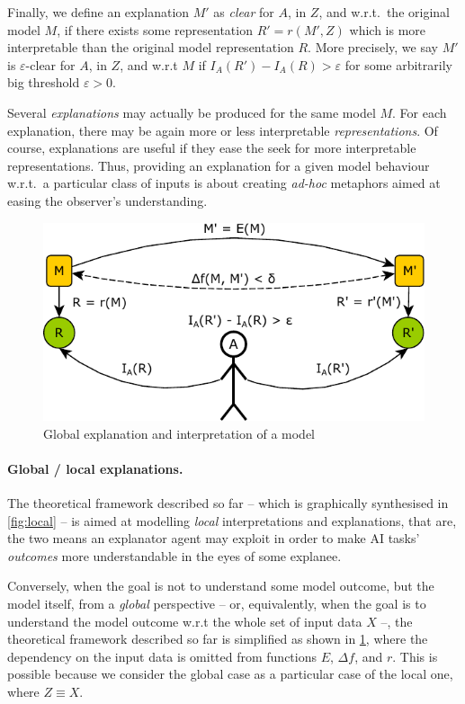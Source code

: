 \documentclass[12pt,a4paper,openright,twoside]{book}
\begin{document}
Finally, we define an explanation $M'$ as \emph{clear} for $A$, in $Z$, and w.r.t.\ the original model $M$, if there exists some representation $R' = r(M', Z)$ which is more interpretable than the original model representation $R$.
%
More precisely, we say $M'$ is $\varepsilon$-clear for $A$, in $Z$, and w.r.t $M$ if $I_A(R') - I_A(R) > \varepsilon$ for some arbitrarily big threshold $\varepsilon > 0$.

Several \emph{explanations} may actually be produced for the same model $M$.
%
For each explanation, there may be again more or less interpretable \emph{representations}.
%
Of course, explanations are useful if they ease the seek for more interpretable representations.
%
Thus, providing an explanation for a given model behaviour w.r.t.\ a particular class of inputs is about creating \emph{ad-hoc} metaphors aimed at easing the observer's understanding.

\begin{figure}
    \centering
    \includegraphics[width=.5\linewidth]{figures/global.pdf}
    \caption{Global explanation and interpretation of a model}
    \label{fig:global}
\end{figure}

\paragraph{Global / local explanations.}

The theoretical framework described so far -- which is graphically synthesised in \cref{fig:local} -- is aimed at modelling \emph{local} interpretations and explanations, that are, the two means an explanator agent may exploit in order to make AI tasks' \emph{outcomes} more understandable in the eyes of some explanee. 

Conversely, when the goal is not to understand some model outcome, but the model itself, from a \emph{global} perspective -- or, equivalently, when the goal is to understand the model outcome w.r.t the whole set of input data $X$ --, the theoretical framework described so far is simplified as shown in \cref{fig:global}, where the dependency on the input data is omitted from functions $E$, $\Delta f$, and $r$.
%
This is possible because we consider the global case as a particular case of the local one, where $Z \equiv X$.
\end{document}
